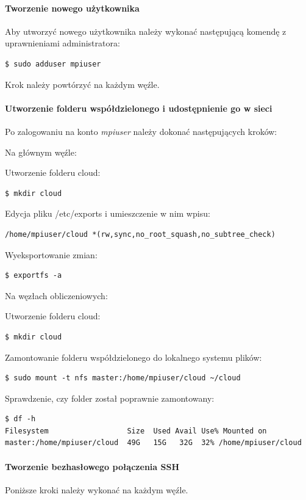 \documentclass{article}
\begin{document}
\paragraph{Tworzenie nowego użytkownika}

Aby utworzyć nowego użytkownika należy wykonać następującą komendę z uprawnieniami administratora:
\begin{lstlisting}
$ sudo adduser mpiuser
\end{lstlisting}

Krok należy powtórzyć na każdym węźle.

\paragraph{Utworzenie folderu współdzielonego i udostępnienie go w sieci}
Po zalogowaniu na konto \textit{mpiuser} należy dokonać następujących kroków:

Na głównym węźle:

Utworzenie folderu cloud:
\begin{lstlisting}
$ mkdir cloud
\end{lstlisting}

Edycja pliku /etc/exports i umieszczenie w nim wpisu:
\begin{lstlisting}
/home/mpiuser/cloud *(rw,sync,no_root_squash,no_subtree_check)
\end{lstlisting}

Wyeksportowanie zmian:

\begin{lstlisting}
$ exportfs -a
\end{lstlisting}
\newpage
Na węzłach obliczeniowych:

Utworzenie folderu cloud:
\begin{lstlisting}
$ mkdir cloud
\end{lstlisting}

Zamontowanie folderu współdzielonego do lokalnego systemu plików:
\begin{lstlisting}
$ sudo mount -t nfs master:/home/mpiuser/cloud ~/cloud
\end{lstlisting}

Sprawdzenie, czy folder został poprawnie zamontowany:
\begin{lstlisting}
$ df -h
Filesystem                  Size  Used Avail Use% Mounted on
master:/home/mpiuser/cloud  49G   15G   32G  32% /home/mpiuser/cloud
\end{lstlisting}

\paragraph{Tworzenie bezhasłowego połączenia SSH}
Poniższe kroki należy wykonać na każdym węźle.
\end{document}
